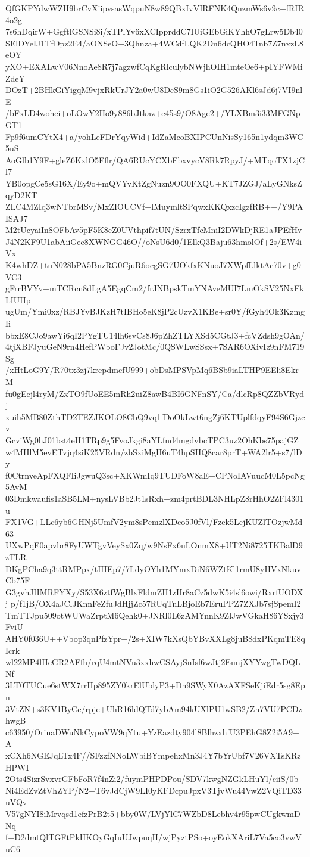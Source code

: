 QfGKPYdwWZH9brCvXiipvsasWqpuN8w89QBxIvVIRFNK4QnzmWs6v9c+fRIR4o2g
7s6hDqirW+GgftlGSNSi8i/xTPlYv6xXCIpprddC7IUiGEbGiKYhhO7gLrw5Db40
SElDYeIJ1TfDpz2E4/aONSeO+3Qhnza+4WCdfLQK2Dn6dcQHO4Tnb7Z7nxzL8eOY
yXO+EXALwV06NnoAe8R7j7agzwfCqKgRlculybNWjhOIH1mteOe6+pIYFWMiZdeY
DOzT+2BHkGiYigqM9vjxRkUrJY2a0wU8DcS9m8Gs1iO2G526AKl6sJd6j7VI9nlE
/bFxLD4wohci+oLOwY2Ho9y886bJtkaz+e45s9/O8Age2+/YLXBm3i33MFGNpGT1
Fp9f6umCYtX4+a/yohLeFDrYqyWid+IdZaMcoBXIPCUnNisSy165n1ydqm3WC5uS
AoGlb1Y9F+gleZ6KxlO5Fflr/QA6RUcYCXbFbxvycV8Rk7RpyJ/+MTqoTX1zjCl7
YB0opgCe5sG16X/Ey9o+mQVYvKtZgNuzn9OO0FXQU+KT7JZGJ/aLyGNksZqyD2KT
ZLC4MZIq3wNTbrMSv/MxZIOUCVf+lMuymltSPqwxKKQxzcIgzfRB++/Y9PAISAJ7
M2tUcyaiIn8OFbAv5pF5K8cZ0UVthpif7tUN/SzrxTfcMniI2DWkDjRE1aJPEfHv
J4N2KF9U1abAiiGee8XWNGG46O//oNsU6d0/1ElkQ3Baju63hmolOf+2s/EW4iVx
K4whDZ+tuN028bPA5BnzRG0CjuR6ocgSG7UOkfxKNuoJ7XWpfLlktAc70v+g0VC3
gFrrBVYv+mTCRcn8dLgA5EgqCm2/frJNBpskTmYNAveMUI7LmOkSV25NxFkLIUHp
ugUm/Ymi0xz/RBJYvBJKzH7tIBHo5eK8jP2cUzvX1KBe+sr0Y/fGyh4Ok3KzmgIi
bbxE8CJo9awYi6qI2PYgTU14lh6svCs8J6pZhZTLYXSd5CGtJ3+fcVZdsh9gOAn/
4tjXBFJyuGeN9rn4HefPWboFJv2JotMc/0QSWLwSSsx+7SAR6OXivIz9nFM719Sg
/xHtLoG9Y/R70tx3zj7krepdmcfU999+obDsMPSVpMq6BSb9iaLTHP9EEli8EkrM
fu0gEejl4ryM/ZxTO9fUoEE5mRh2uiZ8awB4BI6GNFnSY/Ca/dlcRp8QZZbVRydj
xuih5MB80ZthTD2TEZJKOLO8CbQ9vq1fDoOkLwt6ngZj6KTUplfdqyF94S6Gjzcv
GcviWg0hJ01bst4eH1TRp9g5FvoJkgi8aYLfnd4mgdvbcTPC3uz2OhKbs75pajGZ
w4MHlM5evETvjq4siK25VRdn/zbSxiMgH6uT4hpSHQ8car8prT+WA2lr5+s7/lDy
f0CtrnveApFXQFIiJgwuQ3sc+XKWmIq9TUDFoW8aE+CPNoIAVuucM0L5pcNg5AvM
03Dmkwaufis1aSB5LM+nysLVBb2Jt1sRxh+zm4prtBDL3NHLpZ8rHhO2ZFl4301u
FX1VG+LLc6yb6GHNj5UmfV2ym8sPcmzlXDco5J0fVl/Fzek5LcjKUZlTOzjwMd63
UXwPqE0apvbr8FyUWTgvVeySx0Zq/w9NsFx6uLOnmX8+UT2Ni8725TKBalD9zTLR
DKgPCha9q3ttRMPpx/tIHEp7/7LdyOYh1MYmxDiN6WZtKl1rmU8yHVxNkuvCb75F
G3gvhJHMRFYXy/S53X6ztfWgBlxFldmZH1zHr8aCz5dwK5i4sl6owi/RxrfUODXj
p/f1jB/OX4aJClJKnnFeZfuJdHjjZc57RUqTnLBjoEb7EruPPZ7ZXJb7sjSpemI2
TmTTJpu509otWUWaZrptM6Qehk0+JNRl0L6zAMYnnK9ZlJwVGkaH86YSxjy3FviU
AHY0f036U++Vbop3qnPfzYpr+/2s+XIW7kXsQbYBvXXLg8juB8dxPKqmTE8qIcrk
wl22MP4lHcGR2AFfh/rqU4mtNVu3xxhwCSAyjSnIsf6wJtj2EunjXYYwgTwDQLNf
3LT0TUCue6stWX7rrHp895ZY0krElUblyP3+Dn9SWyX0AzAXFSeKjiEdr5sg8Epn
3VtZN+s3KV1ByCc/rpje+UhR16ldQTd7ybAm94kUXlPU1wSB2/Zn7VU7PCDzhwgB
c63950/OrinaDWuNkCypoVW9qYtu+YzEazdty904l8BlhzxhfU3PEhG8Z2i5A9+A
xCXh6NGEJqLTx4F//SFzzfNNoLWbiBYmpehxMn3J4Y7bYrUbf7V26VXTsKRzHPWI
2Ots4SizrSvxvrGFbFoR7f4nZi2/fuymPHPDPou/SDV7kwgNZGkLHuYl/ciiS/0b
Ni4EdZvZtVhZYP/N2+T6vJdCjW9LI0yKFDcpuJpxV3TjvWu44VwZ2VQiTD33uVQv
V57gNYI8iMrvqsd1efzPrB2t5+bby0W/LVjYlC7WZbD8Lebhv4r95pwCUgkwmDNq
f+D2dmtQlTGFtPkHKOyGqIuUJwpuqH/wjPyztPSo+oyEokXAriL7Va5co3vwVuC6

